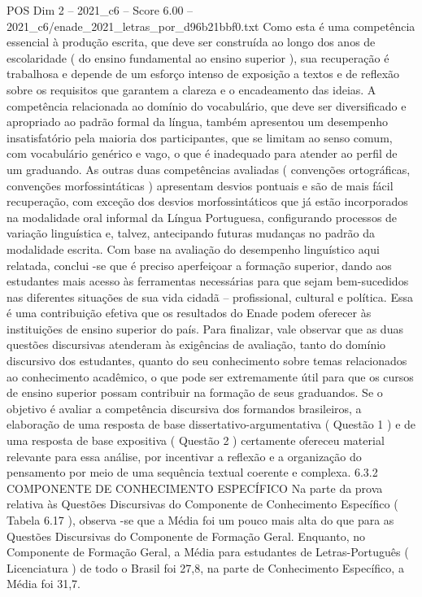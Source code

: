 \begin{textsample}{POS Dim 2 – 2021\_c6 – Score 6.00 – 2021\_c6/enade\_2021\_letras\_por\_d96b21bbf0.txt}
Como esta é uma competência essencial à produção escrita, que deve ser construída ao longo dos anos de escolaridade ( do ensino fundamental ao ensino superior ), sua recuperação é trabalhosa e depende de um esforço intenso de exposição a textos e de reflexão sobre os requisitos que garantem a clareza e o encadeamento das ideias.
A competência relacionada ao domínio do vocabulário, que deve ser diversificado e apropriado ao padrão formal da língua, também apresentou um desempenho insatisfatório pela maioria dos participantes, que se limitam ao senso comum, com vocabulário genérico e vago, o que é inadequado para atender ao perfil de um graduando.
As outras duas competências avaliadas ( convenções ortográficas, convenções morfossintáticas ) apresentam desvios pontuais e são de mais fácil recuperação, com exceção dos desvios morfossintáticos que já estão incorporados na modalidade oral informal da Língua Portuguesa, configurando processos de variação linguística e, talvez, antecipando futuras mudanças no padrão da modalidade escrita.
Com base na avaliação do desempenho linguístico aqui relatada, conclui -se que é preciso aperfeiçoar a formação superior, dando aos estudantes mais acesso às ferramentas necessárias para que sejam bem-sucedidos nas diferentes situações de sua vida cidadã – profissional, cultural e política.
Essa é uma contribuição efetiva que os resultados do Enade podem oferecer às instituições de ensino superior do país.
Para finalizar, vale observar que as duas questões discursivas atenderam às exigências de avaliação, tanto do domínio discursivo dos estudantes, quanto do seu conhecimento sobre temas relacionados ao conhecimento acadêmico, o que pode ser extremamente útil para que os cursos de ensino superior possam contribuir na formação de seus graduandos.
Se o objetivo é avaliar a competência discursiva dos formandos brasileiros, a elaboração de uma resposta de base dissertativo-argumentativa ( Questão 1 ) e de uma resposta de base expositiva ( Questão 2 ) certamente ofereceu material relevante para essa análise, por incentivar a reflexão e a organização do pensamento por meio de uma sequência textual coerente e complexa. 6.3.2 COMPONENTE DE CONHECIMENTO ESPECÍFICO Na parte da prova relativa às Questões Discursivas do Componente de Conhecimento Específico ( Tabela 6.17 ), observa -se que a Média foi um pouco mais alta do que para as Questões Discursivas do Componente de Formação Geral.
Enquanto, no Componente de Formação Geral, a Média para estudantes de Letras-Português ( Licenciatura ) de todo o Brasil foi 27,8, na parte de Conhecimento Específico, a Média foi 31,7.

\end{textsample}
